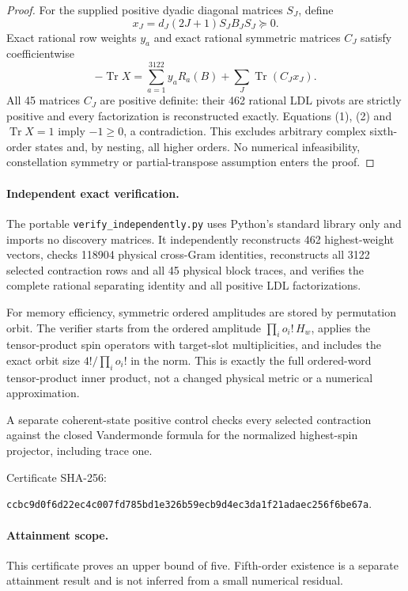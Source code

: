 \documentclass[11pt]{article}
\newcommand{\Tr}{\operatorname{Tr}}
\begin{document}
\begin{proof}
For the supplied positive dyadic diagonal matrices $S_J$, define
\[
x_J=d_J(2J+1)S_JB_JS_J\succeq0.
\]
Exact rational row weights $y_a$ and exact rational symmetric matrices $C_J$ satisfy coefficientwise
\[
\boxed{-\Tr X=\sum_{a=1}^{3122}y_aR_a(B)+\sum_J\Tr(C_Jx_J).} \tag{2}
\]
All 45 matrices $C_J$ are positive definite: their 462 rational LDL pivots are strictly positive and every factorization is reconstructed exactly. Equations (1), (2) and $\Tr X=1$ imply $-1\ge0$, a contradiction. This excludes arbitrary complex sixth-order states and, by nesting, all higher orders. No numerical infeasibility, constellation symmetry or partial-transpose assumption enters the proof.

\end{proof}
\paragraph{Independent exact verification.}
The portable \texttt{verify\_independently.py} uses Python's standard library only and imports no discovery matrices. It independently reconstructs 462 highest-weight vectors, checks 118904 physical cross-Gram identities, reconstructs all 3122 selected contraction rows and all 45 physical block traces, and verifies the complete rational separating identity and all positive LDL factorizations.

For memory efficiency, symmetric ordered amplitudes are stored by permutation orbit. The verifier starts from the ordered amplitude $\prod_i o_i!\,H_w$, applies the tensor-product spin operators with target-slot multiplicities, and includes the exact orbit size $4!/\prod_i o_i!$ in the norm. This is exactly the full ordered-word tensor-product inner product, not a changed physical metric or a numerical approximation.

A separate coherent-state positive control checks every selected contraction against the closed Vandermonde formula for the normalized highest-spin projector, including trace one.

Certificate SHA-256:
\begin{center}\small\texttt{ccbc9d0f6d22ec4c007fd785bd1e326b59ecb9d4ec3da1f21adaec256f6be67a}.\end{center}
\paragraph{Attainment scope.}
This certificate proves an upper bound of five. Fifth-order existence is a separate attainment result and is not inferred from a small numerical residual.
\end{document}
